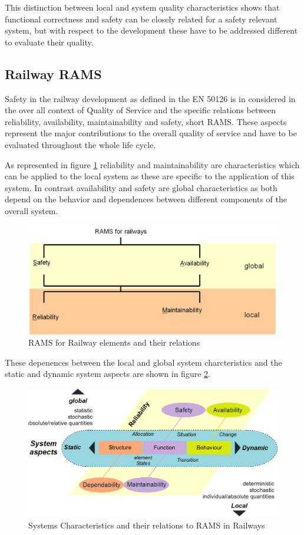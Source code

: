 \documentclass{template/openetcs_report}
\begin{document}
This distinction between local and system quality characteristics shows that functional correctness and safety can be closely related for a safety relevant system, but with respect to the development these have to be addressed different to evaluate their quality.

\subsection{Railway RAMS}

Safety in the railway development as defined in the EN 50126 is in considered in the over all context of Quality of Service and the specific relations between reliability, availability, maintainability and safety, short RAMS. These aspects represent the major contributions to the overall quality of service and have to be evaluated throughout the whole life cycle.

As represented in figure \ref{fig:RAMS-EN50126} reliability and maintainability are characteristics which can be applied to the local system as these are specific to the application of this system. In contrast availability and safety are global characteristics as both depend on the behavior and dependences between different components of the overall system.

\begin{figure}[htbp]
\centering
\includegraphics[width=0.7\linewidth]{images/bld_RAMS-Railway-50126}
\caption{RAMS for Railway elements and their relations \cite{Schnieder.2013}}
\label{fig:RAMS-EN50126}
\end{figure}

These depenences between the local and global system charcteristics and the static and dynamic system aspects are shown in figure \ref{fig:Reliability-RAMS}. 

\begin{figure}[htbp]
\centering
\includegraphics[width=0.7\linewidth]{images/bld_Reliability-system-characteristics}
\caption{Systems Characteristics and their relations to RAMS in Railways \cite{Schnieder.2013}}
\label{fig:Reliability-RAMS}
\end{figure}
\end{document}
